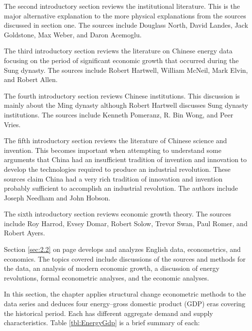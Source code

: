 	The second introductory section reviews the institutional literature. This is the major alternative explanation to the more physical explanations from the sources discussed in section one. The sources include Douglass North, David Landes, Jack Goldstone, Max Weber, and Daron Acemoglu.
	
	The third introductory section reviews the literature on Chinese energy data focusing on the period of significant economic growth that occurred during the Sung dynasty. The sources include Robert Hartwell, William McNeil, Mark Elvin, and Robert Allen.
	
	The fourth introductory section reviews Chinese institutions. This discussion is mainly about the Ming dynasty although Robert Hartwell discusses Sung dynasty institutions. The sources include Kenneth Pomeranz, R. Bin Wong, and Peer Vries.
	
	The fifth introductory section reviews the literature of Chinese science and invention. This becomes important when attempting to understand some arguments that China had an insufficient tradition of invention and innovation to develop the technologies required to produce an industrial revolution. These sources claim China had a very rich tradition of innovation and invention probably sufficient to accomplish an industrial revolution. The authors include Joseph Needham and John Hobson.
	
	The sixth introductory section reviews economic growth theory. The sources include Roy Harrod, Evsey Domar, Robert Solow, Trevor Swan, Paul Romer, and Robert Ayers.
	
	Section \ref{sec:2.2} on page \pageref{sec:2.2} develops and analyzes English data, econometrics, and economics. The topics covered include discussions of the sources and methods for the data, an analysis of modern economic growth, a discussion of energy revolutions, formal econometric analyses, and the economic analyses.
	
	In this section, the chapter applies structural change econometric methods to the data series and deduces four energy--gross domestic product (GDP) eras covering the historical period. Each has different aggregate demand and supply characteristics. Table \ref{tbl:EnergyGdp} is a brief summary of each:


